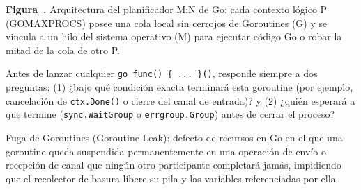 \documentclass{book}
\newcounter{studiumfigure}
\begin{document}
\begin{minipage}{\linewidth}
%
\fi
\fi
\endgroup
\par\nopagebreak
{\small {}\label{fig:fig-go-gmp-scheduler}\textbf{Figura~\thestudiumfigure.} Arquitectura del planificador M:N de Go: cada contexto lógico P (GOMAXPROCS) posee una cola local sin cerrojos de Goroutines (G) y se vincula a un hilo del sistema operativo (M) para ejecutar código Go o robar la mitad de la cola de otro P.\par}
\end{minipage}
\par\vspace{\baselineskip}

\begin{tcolorbox}[title={Consejo}, studiumtip, breakable]

Antes de lanzar cualquier \texttt{go func() \{ ... \}()}, responde siempre a dos preguntas: (1) ¿bajo qué condición exacta terminará esta goroutine (por ejemplo, cancelación de \texttt{ctx.Done()} o cierre del canal de entrada)? y (2) ¿quién esperará a que termine (\texttt{sync.WaitGroup} o \texttt{errgroup.Group}) antes de cerrar el proceso?
\end{tcolorbox}

\begin{tcolorbox}[title={Definición}, studiumdef, breakable]

Fuga de Goroutines (Goroutine Leak): defecto de recursos en Go en el que una goroutine queda suspendida permanentemente en una operación de envío o recepción de canal que ningún otro participante completará jamás, impidiendo que el recolector de basura libere su pila y las variables referenciadas por ella.
\end{tcolorbox}
\end{document}
